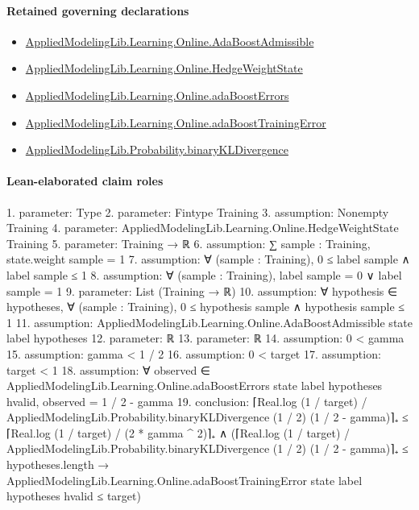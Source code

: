 \documentclass[10pt]{article}
\begin{document}
\paragraph{Retained governing declarations}
\begin{itemize}\raggedright
\item \hyperlink{library-prerequisite-2771987b29f636cf}{Applied\allowbreak{}Modeling\allowbreak{}Lib.\allowbreak{}Learning.\allowbreak{}Online.\allowbreak{}Ada\allowbreak{}Boost\allowbreak{}Admissible}
\item \hyperlink{library-prerequisite-8196082d02788389}{Applied\allowbreak{}Modeling\allowbreak{}Lib.\allowbreak{}Learning.\allowbreak{}Online.\allowbreak{}Hedge\allowbreak{}Weight\allowbreak{}State}
\item \hyperlink{library-prerequisite-ff1cefb5582d918e}{Applied\allowbreak{}Modeling\allowbreak{}Lib.\allowbreak{}Learning.\allowbreak{}Online.\allowbreak{}ada\allowbreak{}Boost\allowbreak{}Errors}
\item \hyperlink{governing-declaration-0e5e303d5e8eab7c}{Applied\allowbreak{}Modeling\allowbreak{}Lib.\allowbreak{}Learning.\allowbreak{}Online.\allowbreak{}ada\allowbreak{}Boost\allowbreak{}Training\allowbreak{}Error}
\item \hyperlink{governing-declaration-b1fa8a0b7a6c91ad}{Applied\allowbreak{}Modeling\allowbreak{}Lib.\allowbreak{}Probability.\allowbreak{}binary\allowbreak{}KL\allowbreak{}Divergence}
\end{itemize}
\paragraph{Lean-elaborated claim roles}\begin{ReviewVerbatim}
1. parameter: Type
2. parameter: Fintype Training
3. assumption: Nonempty Training
4. parameter: AppliedModelingLib.Learning.Online.HedgeWeightState Training
5. parameter: Training → ℝ
6. assumption: ∑ sample : Training, state.weight sample = 1
7. assumption: ∀ (sample : Training), 0 ≤ label sample ∧ label sample ≤ 1
8. assumption: ∀ (sample : Training), label sample = 0 ∨ label sample = 1
9. parameter: List (Training → ℝ)
10. assumption: ∀ hypothesis ∈ hypotheses, ∀ (sample : Training), 0 ≤ hypothesis sample ∧ hypothesis sample ≤ 1
11. assumption: AppliedModelingLib.Learning.Online.AdaBoostAdmissible state label hypotheses
12. parameter: ℝ
13. parameter: ℝ
14. assumption: 0 < gamma
15. assumption: gamma < 1 / 2
16. assumption: 0 < target
17. assumption: target < 1
18. assumption: ∀ observed ∈ AppliedModelingLib.Learning.Online.adaBoostErrors state label hypotheses hvalid, observed = 1 / 2 - gamma
19. conclusion: ⌈Real.log (1 / target) / AppliedModelingLib.Probability.binaryKLDivergence (1 / 2) (1 / 2 - gamma)⌉₊ ≤
    ⌈Real.log (1 / target) / (2 * gamma ^ 2)⌉₊ ∧
  (⌈Real.log (1 / target) / AppliedModelingLib.Probability.binaryKLDivergence (1 / 2) (1 / 2 - gamma)⌉₊ ≤
      hypotheses.length →
    AppliedModelingLib.Learning.Online.adaBoostTrainingError state label hypotheses hvalid ≤ target)
\end{ReviewVerbatim}
\end{document}
